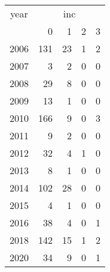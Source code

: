 \footnotesize\begin{tabular}[t]{lrrrr}
\toprule
\multicolumn{1}{c}{year} & \multicolumn{4}{c}{inc} \\
\cmidrule(l{3pt}r{3pt}){1-1} \cmidrule(l{3pt}r{3pt}){2-5}
  & 0 & 1 & 2 & 3\\
\midrule
2006 & 131 & 23 & 1 & 2\\
2007 & 3 & 2 & 0 & 0\\
2008 & 29 & 8 & 0 & 0\\
2009 & 13 & 1 & 0 & 0\\
2010 & 166 & 9 & 0 & 3\\
2011 & 9 & 2 & 0 & 0\\
2012 & 32 & 4 & 1 & 0\\
2013 & 8 & 1 & 0 & 0\\
2014 & 102 & 28 & 0 & 0\\
2015 & 4 & 1 & 0 & 0\\
2016 & 38 & 4 & 0 & 1\\
2018 & 142 & 15 & 1 & 2\\
2020 & 34 & 9 & 0 & 1\\
\bottomrule
\end{tabular}
